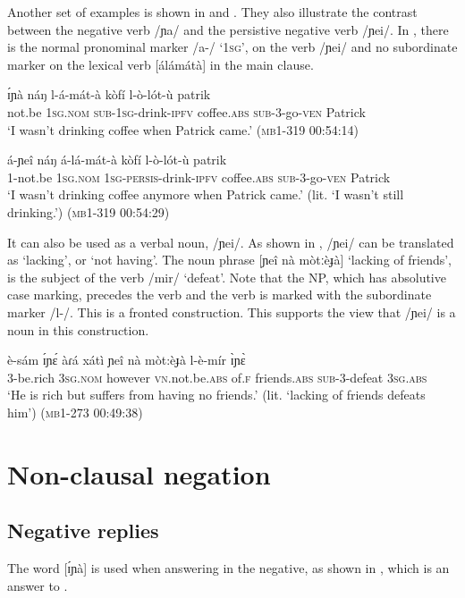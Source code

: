 \documentclass[output=paper,colorlinks,citecolor=brown,draftmode]{langscibook}
\begin{document}
Another set of examples is shown in  and . They also illustrate the contrast between the negative verb /ɲa/ and the persistive negative verb /ɲei/. In , there is the normal pronominal marker /a-/ ‘1\textsc{sg}', on the verb /ɲei/ and no subordinate marker on the lexical verb [álámátà] in the main clause.

\ea\label{ex:lop:70}
        \gll ɪ́ɲà náŋ l-á-mát-à kòfí l-ò-lót-ù patrik \\ 
             not.be 1\textsc{sg.nom} \textsc{sub-1sg}{}-drink-\textsc{ipfv} coffee.\textsc{abs} \textsc{sub}{}-3-go-\textsc{ven} Patrick \\
        \glt ‘I wasn't drinking coffee when Patrick came.’     (\textsc{mb1-319} \textsc{00:}54:14)
\z

\ea\label{ex:lop:71}
        \gll á-ɲeî náŋ á-lá-mát-à kòfí l-ò-lót-ù patrik \\ 
             1-not.be 1\textsc{sg.nom} 1\textsc{sg-persis}{}-drink-\textsc{ipfv} coffee.\textsc{abs} \textsc{sub}{}-3-go-\textsc{ven} Patrick \\
        \glt ‘I wasn't drinking coffee anymore when Patrick came.’ (lit. ‘I wasn’t still drinking.’)    (\textsc{mb1-319} \textsc{00:}54:29)
\z

It can also be used as a verbal noun, /ɲei/.  As shown in , /ɲei/ can be translated as ‘lacking', or ‘not having'. The noun phrase [ɲeî nà mòtːèɟà] ‘lacking of friends', is the subject of the verb /mir/ ‘defeat'. Note that the NP, which has absolutive case marking, precedes the verb and the verb is marked with the subordinate marker /l-/.  This is a fronted construction. This supports the view that /ɲei/ is a noun in this construction.

\ea\label{ex:lop:72}
        \gll è-sám ɪ́ɲɛ́ àɾá xátì ɲeî nà mòt:èɟà l-è-mír ɪ̀ɲɛ̀ \\ 
             3-be.rich 3\textsc{sg.nom} however \textsc{vn}.not.be.\textsc{abs} of.\textsc{f} friends.\textsc{abs} \textsc{sub}{}-3-defeat 3\textsc{sg.abs} \\
        \glt ‘He is rich but suffers from having no friends.’ (lit. ‘lacking of friends defeats him’)  (\textsc{mb1-273} \textsc{00}:49:38)
\z

\section{Non-clausal negation} \label{sec:lop:3}
\subsection{Negative replies}
\label{sec:lop:3.1}
The word [ɪ́ɲà] is used when answering in the negative, as shown in , which is an answer to .
\end{document}

